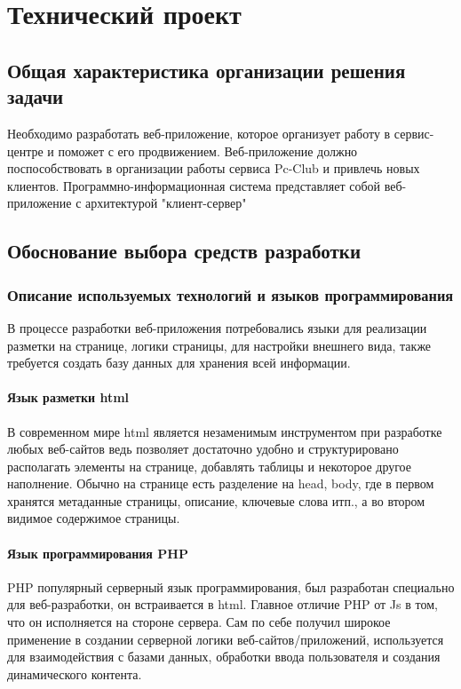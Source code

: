 \section{Технический проект}
\subsection{Общая характеристика организации решения задачи}

Необходимо разработать веб-приложение, которое организует работу в сервис-центре и поможет с его продвижением. Веб-приложение должно поспособствовать в организации работы сервиса Pc-Club и привлечь новых клиентов. Программно-информационная система представляет собой веб-приложение с архитектурой "клиент-сервер"

\subsection{Обоснование выбора средств разработки}
\subsubsection{Описание используемых технологий и языков программирования}

В процессе разработки веб-приложения потребовались языки для реализации разметки на странице, логики страницы, для настройки внешнего вида, также требуется создать базу данных для хранения всей информации. 

\paragraph{Язык разметки html}

В современном мире html является незаменимым инструментом при разработке любых веб-сайтов ведь позволяет достаточно удобно и структурировано располагать элементы на странице, добавлять таблицы и некоторое другое наполнение. Обычно на странице есть разделение на head, body, где в первом хранятся метаданные страницы, описание, ключевые слова итп., а во втором видимое содержимое страницы.

\paragraph{Язык программирования PHP}

PHP популярный серверный язык программирования, был разработан специально для веб-разработки, он встраивается в html. Главное отличие PHP от Js в том, что он исполняется на стороне сервера. Сам по себе получил широкое применение в создании серверной логики веб-сайтов/приложений, используется для взаимодействия с базами данных, обработки ввода пользователя и создания динамического контента.

